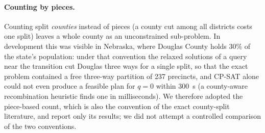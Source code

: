 \paragraph{Counting by pieces.}
Counting split \emph{counties} instead of pieces (a county cut among all districts costs one split) leaves a whole county as an unconstrained sub-problem. In development this was visible in Nebraska, where Douglas County holds 30\% of the state's population: under that convention the relaxed solutions of a query near the transition cut Douglas three ways for a single split, so that the exact problem contained a free three-way partition of 237 precincts, and CP-SAT alone could not even produce a feasible plan for $q=0$ within 300~s (a county-aware recombination heuristic finds one in milliseconds). We therefore adopted the piece-based count, which is also the convention of the exact county-split literature, and report only its results; we did not attempt a controlled comparison of the two conventions.
